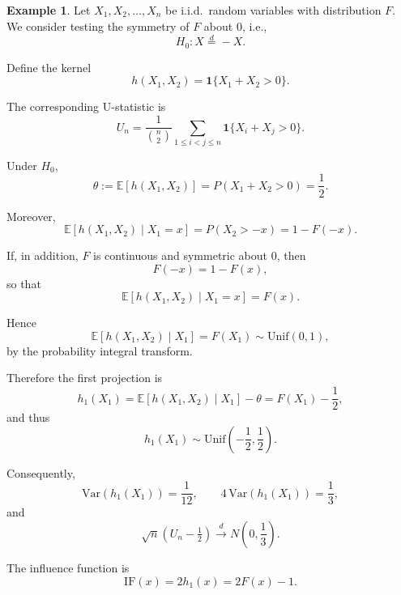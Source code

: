 \documentclass[11pt]{article}
\theoremstyle{definition}
\newtheorem{exmp}{Example}[section]
\begin{document}
\begin{exmp}
Let $X_1, X_2, \dots, X_n$ be i.i.d.\ random variables with distribution $F$. We consider testing the symmetry of $F$ about $0$, i.e.,
\[
H_0: X \overset{d}{=} -X.
\]

Define the kernel
\[
h(X_1, X_2) = \mathbf{1}\{X_1 + X_2 > 0\}.
\]

The corresponding U-statistic is
\[
U_n = \frac{1}{\binom{n}{2}} \sum_{1 \le i < j \le n} \mathbf{1}\{X_i + X_j > 0\}.
\]

Under $H_0$,
\[
\theta := \mathbb{E}[h(X_1,X_2)] = P(X_1+X_2>0)=\frac12.
\]

Moreover,
\[
\mathbb{E}[h(X_1,X_2)\mid X_1=x]
= P(X_2>-x)=1-F(-x).
\]

If, in addition, $F$ is continuous and symmetric about $0$, then
\[
F(-x)=1-F(x),
\]
so that
\[
\mathbb{E}[h(X_1,X_2)\mid X_1=x]=F(x).
\]

Hence
\[
\mathbb{E}[h(X_1,X_2)\mid X_1]=F(X_1)\sim \mathrm{Unif}(0,1),
\]
by the probability integral transform.

Therefore the first projection is
\[
h_1(X_1)
=
\mathbb{E}[h(X_1,X_2)\mid X_1]-\theta
=
F(X_1)-\frac12,
\]
and thus
\[
h_1(X_1)\sim \mathrm{Unif}\left(-\frac12,\frac12\right).
\]

Consequently,
\[
\mathrm{Var}(h_1(X_1))=\frac{1}{12},
\qquad
4\,\mathrm{Var}(h_1(X_1))=\frac13,
\]
and
\[
\sqrt{n}(U_n-\tfrac12)\xrightarrow{d}N\!\left(0,\frac13\right).
\]

The influence function is
\[
\mathrm{IF}(x)=2h_1(x)=2F(x)-1.
\]
\end{exmp}
\end{document}
